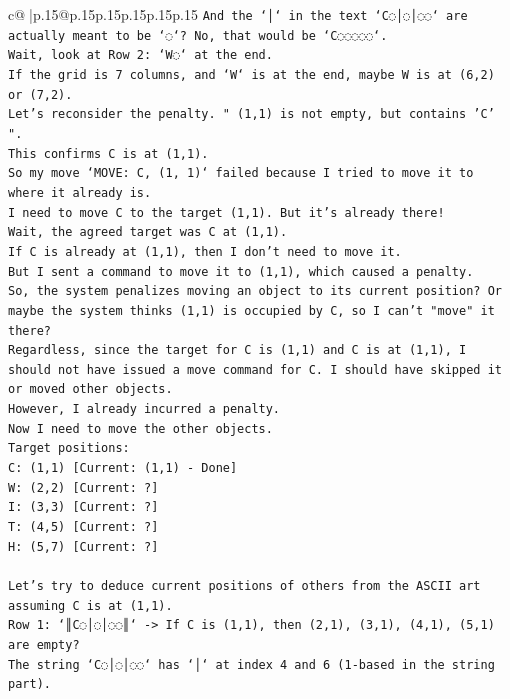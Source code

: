 \documentclass{article}
\begin{document}
{\begin{supertabular}{c@{$\;$}|p{.15\linewidth}@{}p{.15\linewidth}p{.15\linewidth}p{.15\linewidth}p{.15\linewidth}p{.15\linewidth}}
{{{\texttt{And the `│` in the text `C◌│◌│◌◌` are actually meant to be `◌`? No, that would be `C◌◌◌◌◌`.} \\
\texttt{Wait, look at Row 2: `W◌` at the end.} \\
\texttt{If the grid is 7 columns, and `W` is at the end, maybe W is at (6,2) or (7,2).} \\
\texttt{Let's reconsider the penalty. " (1,1) is not empty, but contains 'C' ".} \\
\texttt{This confirms C is at (1,1).} \\
\texttt{So my move `MOVE: C, (1, 1)` failed because I tried to move it to where it already is.} \\
\texttt{I need to move C to the target (1,1). But it's already there!} \\
\texttt{Wait, the agreed target was C at (1,1).} \\
\texttt{If C is already at (1,1), then I don't need to move it.} \\
\texttt{But I sent a command to move it to (1,1), which caused a penalty.} \\
\texttt{So, the system penalizes moving an object to its current position? Or maybe the system thinks (1,1) is occupied by C, so I can't "move" it there?} \\
\texttt{Regardless, since the target for C is (1,1) and C is at (1,1), I should not have issued a move command for C. I should have skipped it or moved other objects.} \\
\texttt{However, I already incurred a penalty.} \\
\texttt{Now I need to move the other objects.} \\
\texttt{Target positions:} \\
\texttt{C: (1,1) {[}Current: (1,1) {-} Done{]}} \\
\texttt{W: (2,2) {[}Current: ?{]}} \\
\texttt{I: (3,3) {[}Current: ?{]}} \\
\texttt{T: (4,5) {[}Current: ?{]}} \\
\texttt{H: (5,7) {[}Current: ?{]}} \\
\\ 
\texttt{Let's try to deduce current positions of others from the ASCII art assuming C is at (1,1).} \\
\texttt{Row 1: `║C◌│◌│◌◌║` {-}> If C is (1,1), then (2,1), (3,1), (4,1), (5,1) are empty?} \\
\texttt{The string `C◌│◌│◌◌` has `│` at index 4 and 6 (1{-}based in the string part).} \\
}}}
\end{supertabular}}
\end{document}
